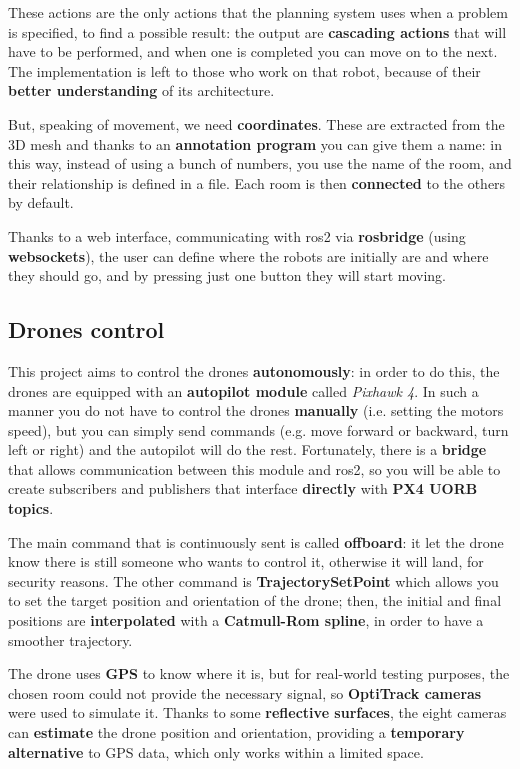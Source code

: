 These actions are the only actions that the planning system uses when a problem is specified, to find a possible result: the output are \textbf{cascading actions} that will have to be performed, and when one is completed you can move on to the next. The implementation is left to those who work on that robot, because of their \textbf{better understanding} of its architecture.

But, speaking of movement, we need \textbf{coordinates}. These are extracted from the 3D mesh and thanks to an \textbf{annotation program} you can give them a name: in this way, instead of using a bunch of numbers, you use the name of the room, and their relationship is defined in a file. Each room is then \textbf{connected} to the others by default.

Thanks to a web interface, communicating with \acrshort{ros}2 via \textbf{rosbridge} (using \textbf{websockets}), the user can define where the robots are initially are and where they should go, and by pressing just one button they will start moving.   

\subsection{Drones control}

This project aims to control the drones \textbf{autonomously}: in order to do this, the drones are equipped with an \textbf{autopilot module} called \textit{Pixhawk 4}. In such a manner you do not have to control the drones \textbf{manually} (i.e. setting the motors speed), but you can simply send commands (e.g. move forward or backward, turn left or right) and the autopilot will do the rest. Fortunately, there is a \textbf{bridge} that allows communication between this module and \acrshort{ros}2, so you will be able to create subscribers and publishers that interface \textbf{directly} with \textbf{PX4 UORB topics}\cite{px4}.

The main command that is continuously sent is called \textbf{offboard}: it let the drone know there is still someone who wants to control it, otherwise it will land, for security reasons. The other command is \textbf{TrajectorySetPoint} which allows you to set the target position and orientation of the drone; then, the initial and final positions are \textbf{interpolated} with a \textbf{Catmull-Rom spline}, in order to have a smoother trajectory.

The drone uses \textbf{GPS} to know where it is, but for real-world testing purposes, the chosen room could not provide the necessary signal, so \textbf{OptiTrack cameras} were used to simulate it. Thanks to some \textbf{reflective surfaces}, the eight cameras can \textbf{estimate} the drone position and orientation, providing a \textbf{temporary alternative} to GPS data, which only works within a limited space.

